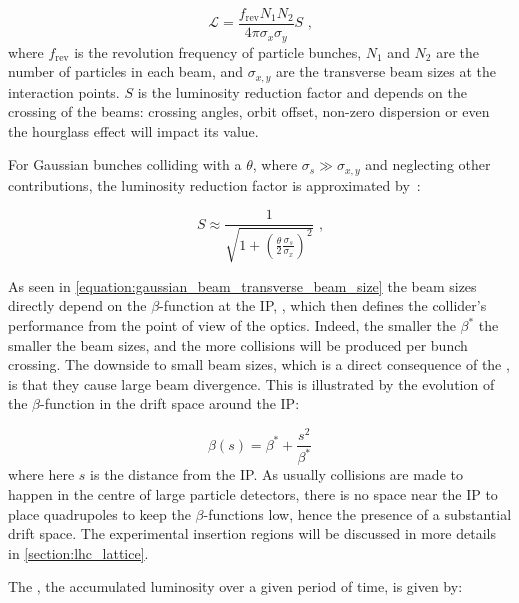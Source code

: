 \begin{equation}
    \mathcal{L} = \frac{f_{\mathrm{rev}} N_1 N_2}{4 \pi \sigma_x \sigma_y} S \text{ ,}
    \label{equation:luminosity_gaussian_beams}
\end{equation}
where \(f_{\mathrm{rev}}\) is the revolution frequency of particle bunches, \(N_1\) and \(N_2\) are the number of particles in each beam, and \(\sigma_{x,y}\) are the transverse beam sizes at the interaction points.
\(S\) is the luminosity reduction factor and depends on the crossing of the beams: crossing angles, orbit offset, non-zero dispersion or even the hourglass effect will impact its value.

For Gaussian bunches colliding with a  \(\theta\), where \(\sigma_s \gg \sigma_{x,y}\) and neglecting other contributions, the luminosity reduction factor is approximated by~\cite{CERN:Herr:Concept_Luminosity}:

\begin{equation}
    S \approx \frac{1}{\sqrt{1 + \left( \frac{\theta}{2} \frac{\sigma_s}{\sigma_x} \right)^2}} \text{ ,}
    \label{equation:luminosity_reduction_factor}
\end{equation}

As seen in \cref{equation:gaussian_beam_transverse_beam_size} the beam sizes directly depend on the \(\beta\)-function at the IP, \betastar, which then defines the collider's performance from the point of view of the optics.
Indeed, the smaller the \(\beta^{\ast}\) the smaller the beam sizes, and the more collisions will be produced per bunch crossing. 
The downside to small beam sizes, which is a direct consequence of the , is that they cause large beam divergence.
This is illustrated by the evolution of the \(\beta\)-function in the drift space around the IP:

\begin{equation}
    \beta(s) = \beta^{\ast} + \frac{s^2}{\beta^{\ast}}
    \label{equation:betafunction_drift_space}
\end{equation}
where here \(s\) is the distance from the IP.
As usually collisions are made to happen in the centre of large particle detectors, there is no space near the IP to place quadrupoles to keep the \(\beta\)-functions low, hence the presence of a substantial drift space.
The experimental insertion regions will be discussed in more details in \cref{section:lhc_lattice}.

The , the accumulated luminosity over a given period of time, is given by:

